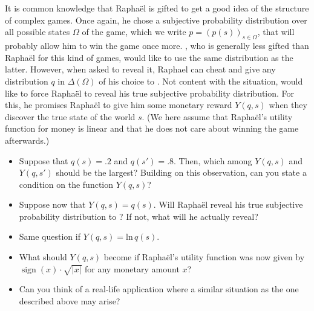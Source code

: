 \documentclass{../ape}
\begin{document}

\section{}
It is common knowledge that Rapha\"el is gifted to get a good idea of the structure of complex games. Once again, he chose a subjective probability distribution over all possible states $\Omega$ of the game, which we write $p = (p(s))_{s \in \Omega}$, that will probably allow him to win the game once more. \TAtwo{}, who is generally less gifted than Rapha\"el for this kind of games, would like to use the same distribution as the latter. However, when asked to reveal it, Raphael can cheat and give any distribution $q$ in $\Delta(\Omega)$ of his choice to \TAtwo{}. Not content with the situation, \TAtwo{} would like to force Rapha\"el to reveal his true subjective probability distribution. For this, he promises Rapha\"el to give him some monetary reward $Y(q, s)$ when they discover the true state of the world $s$. (We here assume that Rapha\"el's utility function for money is linear and that he does not care about winning the game afterwards.)
\begin{itemize}
	\item Suppose that $q(s) = .2$ and $q(s') = .8$. Then, which among $Y(q,s)$ and $Y(q,s')$ should be the largest? Building on this observation, can you state a condition on the function $Y(q,s)$?
	\item Suppose now that $Y(q,s) = q(s)$. Will Rapha\"el reveal his true subjective probability distribution to \TAtwo{}? If not, what will he actually reveal?
	\item Same question if $Y(q, s) = \mathrm{ln}\,q(s)$.
	\item What should $Y(q, s)$ become if Rapha\"el's utility function was now given by $\mathop{\mathrm{sign}}(x)\cdot \sqrt{|x|}$ for any monetary amount $x$?
	\item Can you think of a real-life application where a similar situation as the one described above may arise?
\end{itemize}
\end{document}
